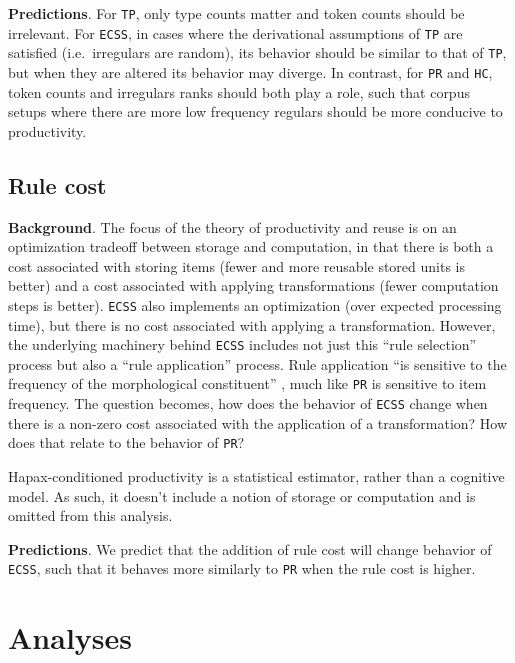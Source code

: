 \documentclass[
   11pt,
       ]{book}
\begin{document}
\textbf{Predictions}. For \texttt{TP}, only type counts matter and token counts should be
irrelevant. For \texttt{ECSS}, in cases where the derivational assumptions of \texttt{TP} are
satisfied (i.e.~irregulars are random), its behavior should be similar to that
of \texttt{TP}, but when they are altered its behavior may diverge. In contrast, for
\texttt{PR} and \texttt{HC}, token counts and irregulars ranks should both play a role, such
that corpus setups where there are more low frequency regulars should be more
conducive to productivity.

\hypertarget{rule-cost}{%
\subsection{Rule cost}\label{rule-cost}}

\textbf{Background}. The focus of the theory of productivity and reuse is on an
optimization tradeoff between storage and computation, in that there is both a
cost associated with storing items (fewer and more reusable stored units is
better) and a cost associated with applying transformations (fewer computation
steps is better). \texttt{ECSS} also implements an optimization (over expected
processing time), but there is no cost associated with applying a
transformation. However, the underlying machinery behind \texttt{ECSS} includes not
just this ``rule selection'' process but also a ``rule application'' process. Rule
application ``is sensitive to the frequency of the morphological constituent''
\citep[p.~55]{yang2016}, much like \texttt{PR} is sensitive to item frequency. The question
becomes, how does the behavior of \texttt{ECSS} change when there is a non-zero cost
associated with the application of a transformation? How does that relate to the
behavior of \texttt{PR}?

Hapax-conditioned productivity is a statistical estimator, rather than a
cognitive model. As such, it doesn't include a notion of storage or computation
and is omitted from this analysis.

\textbf{Predictions}. We predict that the addition of rule cost will change behavior
of \texttt{ECSS}, such that it behaves more similarly to \texttt{PR} when the rule cost is
higher.

\hypertarget{analyses}{%
\section{Analyses}\label{analyses}}
\end{document}
